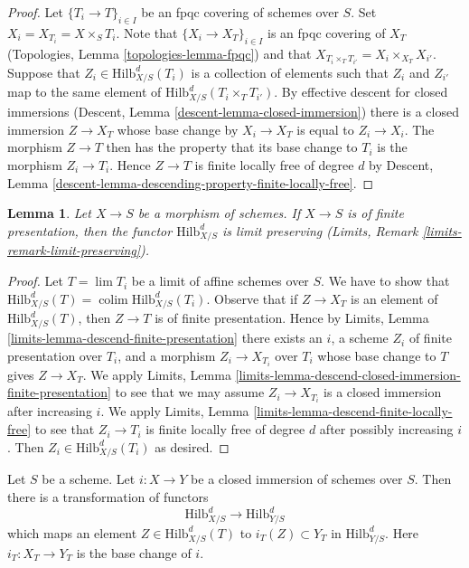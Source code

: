 \documentclass{stacks-project}
\theoremstyle{plain}
\newtheorem{lemma}[subsection]{Lemma}
\theoremstyle{definition}
\theoremstyle{remark}
\numberwithin{equation}{subsection}
\def\lim{\mathop{\mathrm{lim}}\nolimits}
\def\colim{\mathop{\mathrm{colim}}\nolimits}
\def\Hilbfunctor{\mathrm{Hilb}}
\begin{document}
\begin{proof}
Let $\{T_i \to T\}_{i \in I}$ be an fpqc covering of schemes over $S$.
Set $X_i = X_{T_i} = X \times_S T_i$.
Note that $\{X_i \to X_T\}_{i \in I}$ is an fpqc covering of
$X_T$ (Topologies, Lemma \ref{topologies-lemma-fpqc})
and that $X_{T_i \times_T T_{i'}} = X_i \times_{X_T} X_{i'}$.
Suppose that $Z_i \in \Hilbfunctor^d_{X/S}(T_i)$ is a collection of
elements such that $Z_i$ and $Z_{i'}$ map to the same element of
$\Hilbfunctor^d_{X/S}(T_i \times_T T_{i'})$. By effective descent
for closed immersions (Descent, Lemma \ref{descent-lemma-closed-immersion})
there is a closed immersion $Z \to X_T$ whose base change by
$X_i \to X_T$ is equal to $Z_i \to X_i$. The morphism $Z \to T$
then has the property that its base change to $T_i$ is the morphism
$Z_i \to T_i$. Hence $Z \to T$ is finite locally free of degree $d$
by Descent, Lemma \ref{descent-lemma-descending-property-finite-locally-free}.
\end{proof}

\begin{lemma}
\label{lemma-hilb-d-limit-preserving}
Let $X \to S$ be a morphism of schemes. If $X \to S$ is
of finite presentation, then the functor $\Hilbfunctor^d_{X/S}$
is limit preserving (Limits, Remark \ref{limits-remark-limit-preserving}).
\end{lemma}

\begin{proof}
Let $T = \lim T_i$ be a limit of affine schemes over $S$. We have to show
that $\Hilbfunctor^d_{X/S}(T) = \colim \Hilbfunctor^d_{X/S}(T_i)$.
Observe that if $Z \to X_T$ is an element of $\Hilbfunctor^d_{X/S}(T)$,
then $Z \to T$ is of finite presentation. Hence by
Limits, Lemma \ref{limits-lemma-descend-finite-presentation}
there exists an $i$, a scheme $Z_i$ of finite presentation over $T_i$,
and a morphism $Z_i \to X_{T_i}$ over $T_i$ whose base change to $T$
gives $Z \to X_T$. We apply Limits, Lemma
\ref{limits-lemma-descend-closed-immersion-finite-presentation}
to see that we may assume $Z_i \to X_{T_i}$ is a closed immersion
after increasing $i$.
We apply Limits, Lemma \ref{limits-lemma-descend-finite-locally-free}
to see that $Z_i \to T_i$ is finite locally free of degree $d$
after possibly increasing $i$.
Then $Z_i \in \Hilbfunctor^d_{X/S}(T_i)$ as desired.
\end{proof}

\noindent
Let $S$ be a scheme. Let $i : X \to Y$ be a closed immersion of schemes
over $S$. Then there is a transformation of functors
$$
\Hilbfunctor^d_{X/S} \longrightarrow \Hilbfunctor^d_{Y/S}
$$
which maps an element $Z \in \Hilbfunctor^d_{X/S}(T)$ to
$i_T(Z) \subset Y_T$ in $\Hilbfunctor^d_{Y/S}$. Here $i_T : X_T \to Y_T$
is the base change of $i$.
\end{document}
